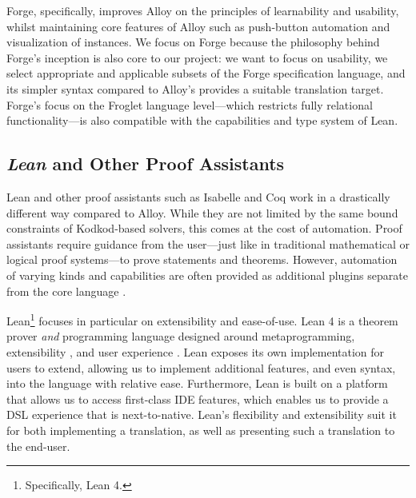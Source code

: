 Forge, specifically, improves Alloy on the principles of learnability and usability, whilst maintaining core features of Alloy such as push-button automation and visualization of instances. We focus on Forge because the philosophy behind Forge's inception is also core to our project: we want to focus on usability, we select appropriate and applicable subsets of the Forge specification language, and its simpler syntax compared to Alloy's provides a suitable translation target. Forge's focus on the Froglet language level---which restricts fully relational functionality---is also compatible with the capabilities and type system of Lean. 


\subsection{\emph{Lean} and Other Proof Assistants}\label{sec:bg-lean}
Lean \cite{moura2021lean} and other proof assistants such as Isabelle \cite{paulson1994isabelle} and Coq \cite{bertot2013interactive} work in a drastically different way compared to Alloy. While they are not limited by the same bound constraints of Kodkod-based solvers, this comes at the cost of automation. Proof assistants require guidance from the user---just like in traditional mathematical or logical proof systems---to prove statements and theorems. However, automation of varying kinds and capabilities are often provided as additional plugins separate from the core language \cite{blanchette2010nitpick,ekici2017smtcoq,czajka2018hammer,limperg2023aesop}. 

Lean\footnote{Specifically, Lean 4.} focuses in particular on extensibility and ease-of-use. Lean 4 is a theorem prover \emph{and} programming language designed around metaprogramming, extensibility \cite{moura2021lean}, and user experience \cite{nawrocki2023extensible}. Lean exposes its own implementation for users to extend, allowing us to implement additional features, and even syntax, into the language with relative ease. Furthermore, Lean is built on a platform that allows us to access first-class IDE features, which enables us to provide a DSL experience that is next-to-native. Lean's flexibility and extensibility suit it for both implementing a translation, as well as presenting such a translation to the end-user. 

